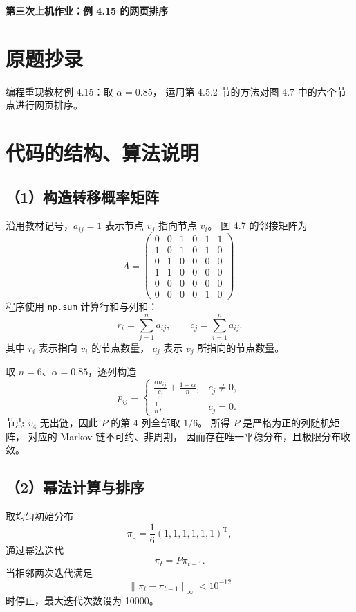 \documentclass[UTF8,a4paper,11pt,fontset=fandol]{ctexart}
\begin{document}
\pagestyle{plain}

\begin{center}
  {\Large\bfseries 第三次上机作业：例 4.15 的网页排序}
\end{center}

\section{原题抄录}

编程重现教材例 4.15：取 $\alpha=0.85$，
运用第 4.5.2 节的方法对图 4.7 中的六个节点进行网页排序。

\section{代码的结构、算法说明}

\subsection*{（1）构造转移概率矩阵}

沿用教材记号，$a_{ij}=1$ 表示节点 $v_j$ 指向节点 $v_i$。
图 4.7 的邻接矩阵为
\[
A=
\begin{pmatrix}
0&0&1&0&1&1\\
1&0&1&0&1&0\\
0&1&0&0&0&0\\
1&1&0&0&0&0\\
0&0&0&0&0&0\\
0&0&0&0&1&0
\end{pmatrix}.
\]
程序使用 \texttt{np.sum} 计算行和与列和：
\[
r_i=\sum_{j=1}^{n}a_{ij},\qquad
c_j=\sum_{i=1}^{n}a_{ij}.
\]
其中 $r_i$ 表示指向 $v_i$ 的节点数量，
$c_j$ 表示 $v_j$ 所指向的节点数量。

取 $n=6$、$\alpha=0.85$，逐列构造
\[
p_{ij}=
\begin{cases}
\displaystyle \frac{\alpha a_{ij}}{c_j}
+\frac{1-\alpha}{n},&c_j\ne0,\\[6pt]
\displaystyle \frac1n,&c_j=0.
\end{cases}
\]
节点 $v_4$ 无出链，因此 $P$ 的第 4 列全部取 $1/6$。
所得 $P$ 是严格为正的列随机矩阵，
对应的 Markov 链不可约、非周期，
因而存在唯一平稳分布，且极限分布收敛。

\subsection*{（2）幂法计算与排序}

取均匀初始分布
\[
\pi_0=\frac16(1,1,1,1,1,1)^{\mathrm T},
\]
通过幂法迭代
\[
\pi_t=P\pi_{t-1}.
\]
当相邻两次迭代满足
\[
\|\pi_t-\pi_{t-1}\|_\infty<10^{-12}
\]
时停止，最大迭代次数设为 10000。
\end{document}
